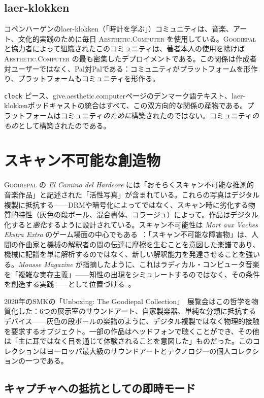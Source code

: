 \documentclass[10pt,letterpaper,twocolumn]{article}
\newcommand{\ac}{\textsc{Aesthetic.Computer}}
\newcommand{\gp}{\textsc{Goodiepal}}
\begin{document}
\subsection{laer-klokken}

コペンハーゲンのlaer-klokken（「時計を学ぶ」）コミュニティは、音楽、アート、文化的実践のために毎日 \ac{} を使用している。\gp{} と協力者によって組織されたこのコミュニティは、著者本人の使用を除けば \ac{} の最も密集したデプロイメントである。この関係は作成者対ユーザーではなく、Pal対Palである：コミュニティがプラットフォームを形作り、プラットフォームもコミュニティを形作る。

\texttt{clock} ピース、give.aesthetic.computerページのデンマーク語テキスト、laer-klokkenポッドキャストの統合はすべて、この双方向的な関係の産物である。プラットフォームはコミュニティ\emph{のために}構築されたのではない。コミュニティ\emph{のもの}として構築されたのである。

\section{スキャン不可能な創造物}

\gp{} の \emph{El Camino del Hardcore} には「おそらくスキャン不可能な推測的音楽作品」と記述された「活性写真」が含まれている。これらの写真はデジタル複製に抵抗する——DRMや暗号化によってではなく、スキャン時に劣化する物質的特性（灰色の段ボール、混合書体、コラージュ）によって。作品はデジタル化すると\emph{悪化}するように設計されている。スキャン不可能性は \emph{Mort aux Vaches Ekstra Extra} のゲーム場面の中心でもある~\citep{goodiepal2007mortauxvaches}：「スキャン不可能な障害物」は、人間の作曲家と機械の解釈者の間の伝達に摩擦を生むことを意図した楽譜であり、機械に記譜を単に解析するのではなく、新しい解釈能力を発達させることを強いる。\emph{Mousse Magazine} が指摘したように、これはラディカル・コンピュータ音楽を「複雑な実存主義」——知性の出現をシミュレートするのではなく、その条件を創造する実践——として位置づける~\citep{mousse2018goodiepal}。

2020年のSMKの「Unboxing: The Goodiepal Collection」~\citep{smk2020unboxing}展覧会はこの哲学を物質化した：6つの展示室のサウンドアート、自家製楽器、単純な分類に抵抗するデバイス——灰色の段ボールの楽譜のように、デジタル複製ではなく物理的接触を要求するオブジェクト。一部の作品はヘッドフォンで聴くことができ、その他は「主に耳ではなく目を通じて体験されることを意図した」ものだった。このコレクションはヨーロッパ最大級のサウンドアートとテクノロジーの個人コレクションの一つである。

\subsection{キャプチャへの抵抗としての即時モード}
\end{document}

